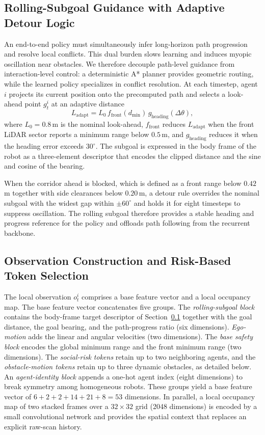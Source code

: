 \documentclass[journal,twoside,web]{ieeecolor}
\begin{document}
\subsection{Rolling-Subgoal Guidance with Adaptive Detour Logic}
\label{sec:rolling}

An end-to-end policy must simultaneously infer long-horizon path progression and resolve local conflicts. This dual burden slows learning and induces myopic oscillation near obstacles. We therefore decouple path-level guidance from interaction-level control: a deterministic A* planner provides geometric routing, while the learned policy specializes in conflict resolution. At each timestep, agent $i$ projects its current position onto the precomputed path and selects a look-ahead point $g_t^i$ at an adaptive distance
\[
L_{\text{adapt}} = L_0 \, f_{\text{front}}(d_{\min}) \, g_{\text{heading}}(\Delta\theta),
\]
where $L_0 = 0.8$\,m is the nominal look-ahead, $f_{\text{front}}$ reduces $L_{\text{adapt}}$ when the front LiDAR sector reports a minimum range below $0.5$\,m, and $g_{\text{heading}}$ reduces it when the heading error exceeds $30^\circ$. The subgoal is expressed in the body frame of the robot as a three-element descriptor that encodes the clipped distance and the sine and cosine of the bearing.

When the corridor ahead is blocked, which is defined as a front range below $0.42$\,m together with side clearances below $0.20$\,m, a detour rule overrides the nominal subgoal with the widest gap within $\pm 60^\circ$ and holds it for eight timesteps to suppress oscillation. The rolling subgoal therefore provides a stable heading and progress reference for the policy and offloads path following from the recurrent backbone.

\subsection{Observation Construction and Risk-Based Token Selection}
\label{sec:obs}

The local observation $o_t^i$ comprises a base feature vector and a local occupancy map. The base feature vector concatenates five groups. The \emph{rolling-subgoal block} contains the body-frame target descriptor of Section~\ref{sec:rolling} together with the goal distance, the goal bearing, and the path-progress ratio (six dimensions). \emph{Ego-motion} adds the linear and angular velocities (two dimensions). The \emph{base safety block} encodes the global minimum range and the front minimum range (two dimensions). The \emph{social-risk tokens} retain up to two neighboring agents, and the \emph{obstacle-motion tokens} retain up to three dynamic obstacles, as detailed below. An \emph{agent-identity block} appends a one-hot agent index (eight dimensions) to break symmetry among homogeneous robots. These groups yield a base feature vector of $6+2+2+14+21+8=53$ dimensions. In parallel, a local occupancy map of two stacked frames over a $32\times32$ grid (2048 dimensions) is encoded by a small convolutional network and provides the spatial context that replaces an explicit raw-scan history.
\end{document}
